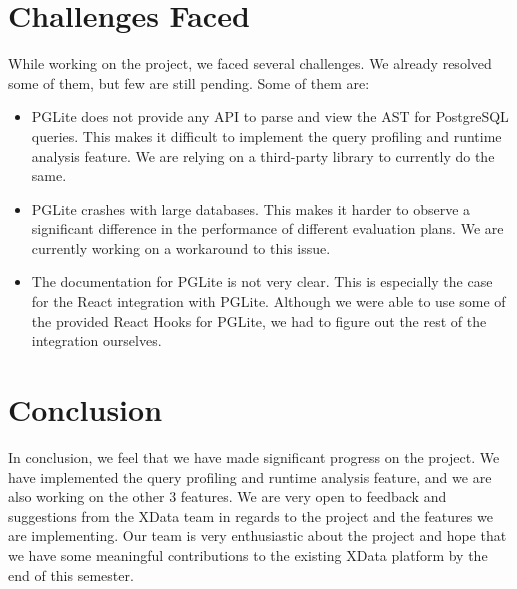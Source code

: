 \documentclass{article}
\begin{document}
\section{Challenges Faced}
While working on the project, we faced several challenges. We already resolved some of them, but few are still pending. Some of them are:
\begin{itemize}
    \item PGLite does not provide any API to parse and view the AST for PostgreSQL queries. This makes it difficult to implement the query profiling and runtime analysis feature. We are relying on a third-party library to currently do the same.
    \item PGLite crashes with large databases. This makes it harder to observe a significant difference in the performance of different evaluation plans. We are currently working on a workaround to this issue.
    \item The documentation for PGLite is not very clear. This is especially the case for the React integration with PGLite. Although we were able to use some of the provided React Hooks for PGLite, we had to figure out the rest of the integration ourselves. 
\end{itemize}

\section{Conclusion}

In conclusion, we feel that we have made significant progress on the project. We have implemented the query profiling and runtime analysis feature, and we are also working on the other 3 features. We are very open to feedback and suggestions from the XData team in regards to the project and the features we are implementing. Our team is very enthusiastic about the project and hope that we have some meaningful contributions to the existing XData platform by the end of this semester.

    
\end{document}
